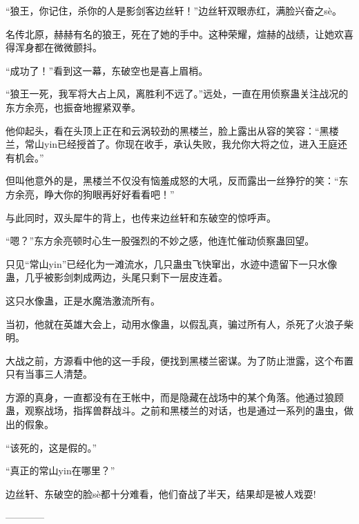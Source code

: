 \begin{this_body}
“狼王，你记住，杀你的人是影剑客边丝轩！”边丝轩双眼赤红，满脸兴奋之sè。

名传北原，赫赫有名的狼王，死在了她的手中。这种荣耀，煊赫的战绩，让她欢喜得浑身都在微微颤抖。

“成功了！”看到这一幕，东破空也是喜上眉梢。

“狼王一死，我军将大占上风，离胜利不远了。”远处，一直在用侦察蛊关注战况的东方余亮，也振奋地握紧双拳。

他仰起头，看在头顶上正在和云涡较劲的黑楼兰，脸上露出从容的笑容：“黑楼兰，常山yin已经授首了。你现在收手，承认失败，我允你大将之位，进入王庭还有机会。”

但叫他意外的是，黑楼兰不仅没有恼羞成怒的大吼，反而露出一丝狰狞的笑：“东方余亮，睁大你的狗眼再好好看看吧！”

与此同时，双头犀牛的背上，也传来边丝轩和东破空的惊呼声。

“嗯？”东方余亮顿时心生一股强烈的不妙之感，他连忙催动侦察蛊回望。

只见“常山yin”已经化为一滩流水，几只蛊虫飞快窜出，水迹中遗留下一只水像蛊，几乎被影剑刺成两边，头尾只剩下一层皮连着。

这只水像蛊，正是水魔浩激流所有。

当初，他就在英雄大会上，动用水像蛊，以假乱真，骗过所有人，杀死了火浪子柴明。

大战之前，方源看中他的这一手段，便找到黑楼兰密谋。为了防止泄露，这个布置只有当事三人清楚。

方源的真身，一直都没有在王帐中，而是隐藏在战场中的某个角落。他通过狼顾蛊，观察战场，指挥兽群战斗。之前和黑楼兰的对话，也是通过一系列的蛊虫，做出的假象。

“该死的，这是假的。”

“真正的常山yin在哪里？”

边丝轩、东破空的脸sè都十分难看，他们奋战了半天，结果却是被人戏耍!

------------

\end{this_body}

